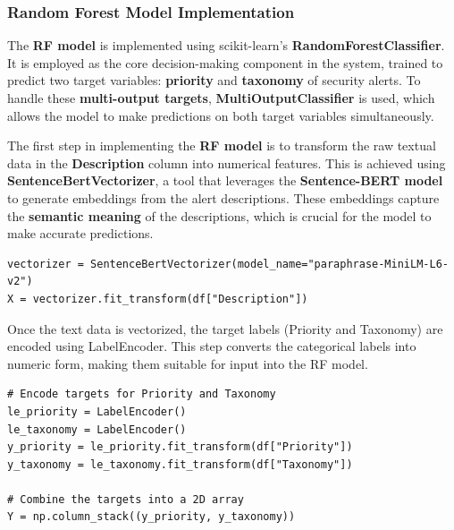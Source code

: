 \subsubsection{Random Forest Model Implementation}

The \textbf{RF model} is implemented using scikit-learn's \textbf{RandomForestClassifier}. 
It is employed as the core decision-making component in the system, trained to predict two target variables: \textbf{priority} and \textbf{taxonomy} of security alerts. 
To handle these \textbf{multi-output targets}, \textbf{MultiOutputClassifier} is used, which allows the model to make predictions on both target variables simultaneously.

The first step in implementing the \textbf{RF model} is to transform the raw textual data in the \textbf{Description} column into numerical features. 
This is achieved using \textbf{SentenceBertVectorizer}, a tool that leverages the \textbf{Sentence-BERT model} to generate embeddings from the alert descriptions. 
These embeddings capture the \textbf{semantic meaning} of the descriptions, which is crucial for the model to make accurate predictions.

\vspace{0.2cm}
\noindent
\begin{minipage}{\linewidth}
\begin{verbatim}
vectorizer = SentenceBertVectorizer(model_name="paraphrase-MiniLM-L6-v2")
X = vectorizer.fit_transform(df["Description"])
\end{verbatim}
\label{lst:vectorizing_text_data}
\end{minipage}
\vspace{0.1cm}

Once the text data is vectorized, the target labels (Priority and Taxonomy) are encoded using LabelEncoder. 
This step converts the categorical labels into numeric form, making them suitable for input into the RF model.

\vspace{0.2cm}
\noindent
\begin{minipage}{\linewidth}
\begin{verbatim}
# Encode targets for Priority and Taxonomy
le_priority = LabelEncoder()
le_taxonomy = LabelEncoder()
y_priority = le_priority.fit_transform(df["Priority"])
y_taxonomy = le_taxonomy.fit_transform(df["Taxonomy"])

# Combine the targets into a 2D array
Y = np.column_stack((y_priority, y_taxonomy))
\end{verbatim}
\label{lst:encoding_target_labels}
\end{minipage}
\vspace{0.1cm}

